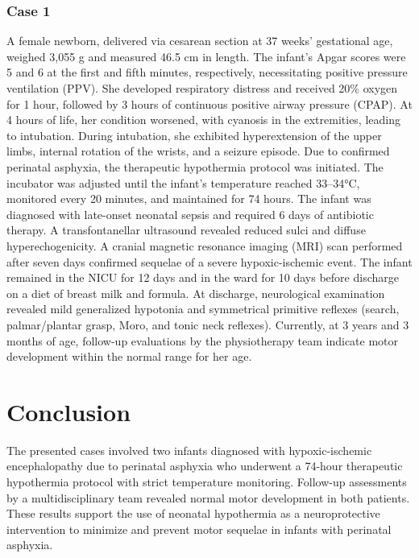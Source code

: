 \documentclass[11pt,a4paper]{article}
\begin{document}
	\subsubsection{Case 1}
	A female newborn, delivered via cesarean section at 37 weeks’ gestational age, weighed 3,055 g and measured 46.5 cm in length. The infant’s Apgar scores were 5 and 6 at the first and fifth minutes, respectively, necessitating positive pressure ventilation (PPV). She developed respiratory distress and received 20\% oxygen for 1 hour, followed by 3 hours of continuous positive airway pressure (CPAP). At 4 hours of life, her condition worsened, with cyanosis in the extremities, leading to intubation. During intubation, she exhibited hyperextension of the upper limbs, internal rotation of the wrists, and a seizure episode.
	Due to confirmed perinatal asphyxia, the therapeutic hypothermia protocol was initiated. The incubator was adjusted until the infant’s temperature reached 33–34°C, monitored every 20 minutes, and maintained for 74 hours. The infant was diagnosed with late-onset neonatal sepsis and required 6 days of antibiotic therapy. A transfontanellar ultrasound revealed reduced sulci and diffuse hyperechogenicity. A cranial magnetic resonance imaging (MRI) scan performed after seven days confirmed sequelae of a severe hypoxic-ischemic event.
	The infant remained in the NICU for 12 days and in the ward for 10 days before discharge on a diet of breast milk and formula. At discharge, neurological examination revealed mild generalized hypotonia and symmetrical primitive reflexes (search, palmar/plantar grasp, Moro, and tonic neck reflexes). Currently, at 3 years and 3 months of age, follow-up evaluations by the physiotherapy team indicate motor development within the normal range for her age.
		
	\section{Conclusion}
	The presented cases involved two infants diagnosed with hypoxic-ischemic encephalopathy due to perinatal asphyxia who underwent a 74-hour therapeutic hypothermia protocol with strict temperature monitoring. Follow-up assessments by a multidisciplinary team revealed normal motor development in both patients. These results support the use of neonatal hypothermia as a neuroprotective intervention to minimize and prevent motor sequelae in infants with perinatal asphyxia.
	
	\newpage
	
	\printbibliography[title=References]
		
\end{document}
